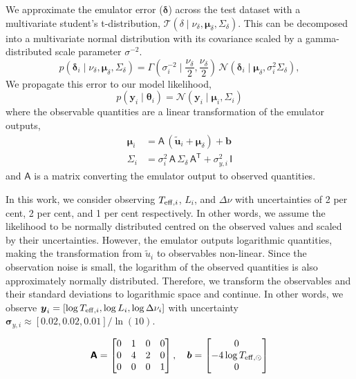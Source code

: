\documentclass[fleqn,usenatbib]{mnras}
\newcommand{\normaldist}{\mathcal{N}}
\newcommand{\gammadist}{\Gamma}
\newcommand{\tdist}{\mathcal{T}}
\renewcommand*{\vec}[1]{\boldsymbol{#1}}
\newcommand*{\mat}[1]{\boldsymbol{\mathsf{#1}}}
\newcommand*{\transpose}{\mathsf{T}}
\newcommand{\obs}{{y}}
\newcommand{\outputs}{{u}}
\newcommand{\pred}{{\tilde{\outputs}}}
\newcommand{\error}{{\delta}}
\newcommand{\teff}[1][]{{\ensuremath{T_{\mathrm{eff} \ifx#1\empty \else , #1 \fi}}}}
\begin{document}
We approximate the emulator error (\(\vec\delta\)) across the test dataset with a multivariate student's t-distribution, \(\tdist(\delta \mid \nu_\delta, \vec\mu_\delta, \mat\Sigma_\delta)\). This can be decomposed into a multivariate normal distribution with its covariance scaled by a gamma-distributed scale parameter \(\sigma^{-2}\).
%
\begin{equation}
    p(\vec\error_i \mid \nu_\delta, \vec\mu_\delta, \mat\Sigma_\delta) = \gammadist(\sigma_i^{-2} \mid \frac{\nu_\delta}{2}, \frac{\nu_\delta}{2}) \, \normaldist(\vec\error_i \mid \vec\mu_\delta, \sigma_i^2 \mat\Sigma_\delta),
\end{equation}
%
We propagate this error to our model likelihood,
%
\begin{equation}
    p(\vec\obs_i \mid \vec\theta_i) = \normaldist(\vec\obs_i \mid \vec\mu_i, \mat\Sigma_i)
\end{equation}
%
where the observable quantities are a linear transformation of the emulator outputs,
%
\begin{align}
    \vec\mu_i &= \mat A \, (\vec\pred_i + \vec\mu_\delta) + \vec b\\
    \mat\Sigma_i &= \sigma_i^2 \, \mat{A} \, \mat{\Sigma}_\delta \, \mat{A}^{\transpose} + \sigma_{y,i}^2 \, \mat{I} \label{eq:covariance}
\end{align}
%
and \(\mat A\) is a matrix converting the emulator output to observed quantities.

In this work, we consider observing \(\teff[i]\), \(L_i\), and \(\Delta\nu\) with uncertainties of 2 per cent, 2 per cent, and 1 per cent respectively. In other words, we assume the likelihood to be normally distributed centred on the observed values and scaled by their uncertainties. However, the emulator outputs logarithmic quantities, making the transformation from \(\pred_i\) to observables non-linear. Since the observation noise is small, the logarithm of the observed quantities is also approximately normally distributed. Therefore, we transform the observables and their standard deviations to logarithmic space and continue. In other words, we observe \(\vec\obs_i = [\log\teff[i], \log L_i, \log\Delta\nu_i]\) with uncertainty \(\vec\sigma_{y, i} \approx [0.02, 0.02, 0.01] / \ln(10)\).

\begin{equation}
    \mat A = 
    \begin{bmatrix}
        0 & 1 & 0 & 0\\
        0 & 4 & 2 & 0\\
        0 & 0 & 0 & 1
    \end{bmatrix}
    , \quad
    \vec b =
    \begin{bmatrix}
        0\\
        - 4 \log \teff[\odot]\\
        0
    \end{bmatrix}
\end{equation}
\end{document}
